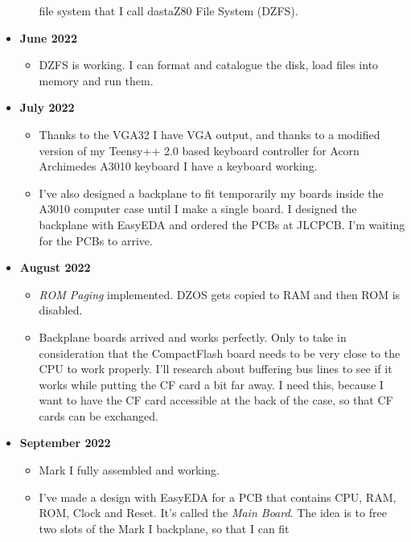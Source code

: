 \documentclass[a4paper,11pt]{article}
\begin{document}
\begin{itemize}
\begin{itemize}
            file system that I call dastaZ80 File System (DZFS).
        \end{itemize}
        \item \textbf{June 2022}
        \begin{itemize}
            \item DZFS is working. I can format and catalogue the disk, load
            files into memory and run them.
        \end{itemize}
        \item \textbf{July 2022}
        \begin{itemize}
            \item Thanks to the VGA32 I have VGA output, and thanks to a
            modified version of my Teensy++ 2.0 based keyboard controller for
            Acorn Archimedes A3010 keyboard I have a keyboard working.
            \item I've also designed a backplane to fit temporarily my boards
            inside the A3010 computer case until I make a single board. I
            designed the backplane with EasyEDA and ordered the PCBs at JLCPCB.
            I'm waiting for the PCBs to arrive.
        \end{itemize}
        \item \textbf{August 2022}
        \begin{itemize}
            \item \textit{ROM Paging} implemented. DZOS gets copied to RAM and
            then ROM is disabled.
            \item Backplane boards arrived and works perfectly. Only to take in
            consideration that the CompactFlash board needs to be very close to
            the CPU to work properly. I'll research about buffering bus lines to
            see if it works while putting the CF card a bit far away. I need
            this, because I want to have the CF card accessible at the back of
            the case, so that CF cards can be exchanged.
        \end{itemize}
        \item \textbf{September 2022}
        \begin{itemize}
            \item Mark I fully assembled and working.
            \item I've made a design with EasyEDA for a PCB that contains CPU,
            RAM, ROM, Clock and Reset. It's called the \textit{Main Board}. The
            idea is to free two slots of the Mark I backplane, so that I can fit

\end{itemize}
\end{itemize}
\end{document}
